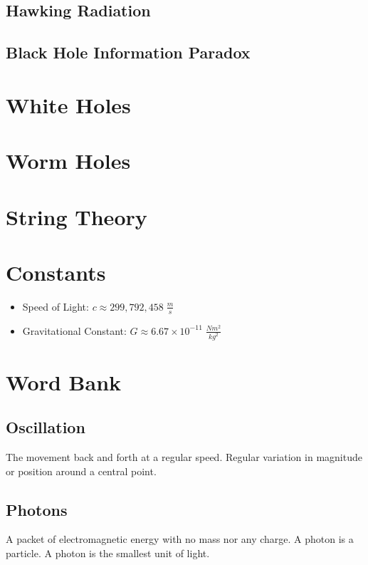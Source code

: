 \documentclass{article}
\begin{document}
\subsection{Hawking Radiation}


\subsection{Black Hole Information Paradox}




\section{White Holes}




\section{Worm Holes}



\section{String Theory}



\section{Constants}\label{sec:constants}
\begin{itemize}
    \item Speed of Light: $c \approx 299,792,458\;\frac{m}{s}$
    \item Gravitational Constant: $G \approx 6.67 \times 10^{-11}\;\frac{Nm^2}{kg^2}$
\end{itemize}

\section{Word Bank}
\subsection{Oscillation}\label{sec:oscillation}
The movement back and forth at a regular speed. Regular variation in magnitude or position around a central point.

\subsection{Photons}\label{sec:photons}
A packet of electromagnetic energy with no mass nor any charge. A photon is a particle. A photon is the smallest unit of light.
\end{document}
